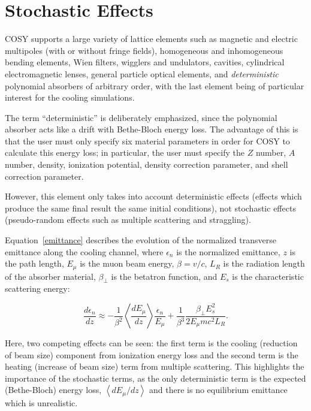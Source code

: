 \documentclass{jacow}
\begin{document}
\section{Stochastic Effects}

COSY supports a large variety of lattice elements such as magnetic and electric multipoles (with or without fringe fields), homogeneous and inhomogeneous bending elements, Wien filters, wigglers and undulators, cavities, cylindrical electromagnetic lenses, general particle optical elements, and \emph{deterministic} polynomial absorbers of arbitrary order, with the last element being of particular interest for the cooling simulations.


The term ``deterministic'' is deliberately emphasized, since the polynomial absorber acts like a drift with Bethe-Bloch energy loss. The advantage of this is that the user must only specify six material parameters in order for COSY to calculate this energy loss; in particular, the user must specify the $Z$ number, $A$ number, density, ionization potential, density correction parameter, and shell correction parameter.

However, this element only takes into account deterministic effects (effects which produce the same final result the same initial conditions), not stochastic effects (pseudo-random effects such as multiple scattering and straggling).

Equation~\eqref{emittance} describes the evolution of the normalized transverse emittance along the cooling channel, where $\epsilon_n$ is the normalized emittance, $z$ is the path length, $E_\mu$ is the muon beam energy, $\beta = v/c$, $L_R$ is the radiation length of the absorber material, $\beta_\perp$ is the betatron function, and $E_s$ is the characteristic scattering energy:

\begin{equation}
\frac{d\epsilon_n }{dz} \approx -\frac{1}{\beta^2} \left< \frac{dE_\mu}{dz} \right> \frac{\epsilon_n}{E_\mu} + \frac{1}{\beta^3} \frac{\beta_\perp E_s ^2}{2E_\mu mc^2 L_R}.
\label{emittance}
\end{equation}

Here, two competing effects can be seen: the first term is the cooling (reduction of beam size) component from ionization energy loss and the second term is the heating (increase of beam size) term from multiple scattering. This highlights the importance of the stochastic terms, as the only deterministic term is the expected (Bethe-Bloch) energy loss, $\left< dE_\mu/dz \right>$ and there is no equilibrium emittance which is unrealistic.
\end{document}
